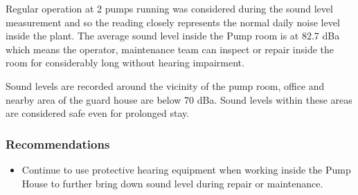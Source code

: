 

Regular operation at 2 pumps running was considered during the sound level measurement and so the reading closely represents the normal daily noise level inside the plant. The average sound level inside the Pump room is at 82.7 dBa which means the operator, maintenance team can inspect or repair inside the room for considerably long without hearing impairment.

Sound levels are recorded around the vicinity of the pump room, office and nearby area of the guard house are below 70 dBa. Sound levels within these areas are considered safe even for prolonged stay.


\subsubsection{Recommendations}

\begin{itemize}
	\item	Continue to use protective hearing equipment when working inside the Pump House to further bring down sound level during repair or maintenance.

\end{itemize}


